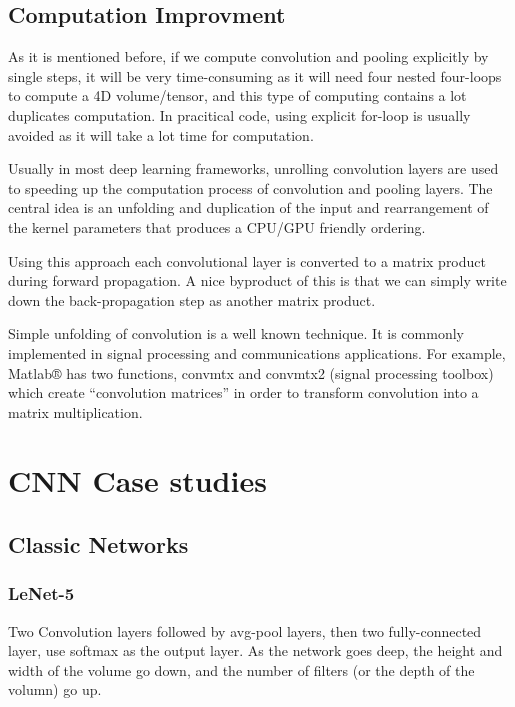 \documentclass{article}
\begin{document}
	\subsection{Computation Improvment}
		\begin{flushleft}
			As it is mentioned before, if we compute convolution and pooling explicitly by single steps, it will be very time-consuming as it will need four nested four-loops to compute a 4D volume/tensor, and this type of computing contains a lot duplicates computation. In pracitical code, using explicit for-loop is usually avoided as it will take a lot time for computation.
		\end{flushleft}
		\begin{flushleft}
			Usually in most deep learning frameworks, unrolling convolution layers are used to speeding up the computation process of convolution and pooling layers. The central idea is an unfolding and duplication of the input and rearrangement of the kernel parameters that produces a CPU/GPU friendly ordering.
		\end{flushleft}
		\begin{flushleft}
			Using this approach each convolutional layer is converted to a matrix product during forward propagation. A nice byproduct of this is that we can simply write down the back-propagation step as another matrix product. 
		\end{flushleft}
		\begin{flushleft}
			Simple unfolding of convolution is a well known technique. It is commonly implemented in signal processing and communications applications. For example, Matlab® has two functions, convmtx and convmtx2 (signal processing toolbox) which create “convolution matrices” in order to transform convolution into a matrix multiplication.
		\end{flushleft}
\section{CNN Case studies}
	\subsection{Classic Networks}
		\subsubsection{LeNet-5}
			Two Convolution layers followed by avg-pool layers, then two fully-connected layer, use softmax as the output layer. As the network goes deep,
the height and width of the volume go down, and the number of filters (or the depth of the volumn) go up.
\end{document}
